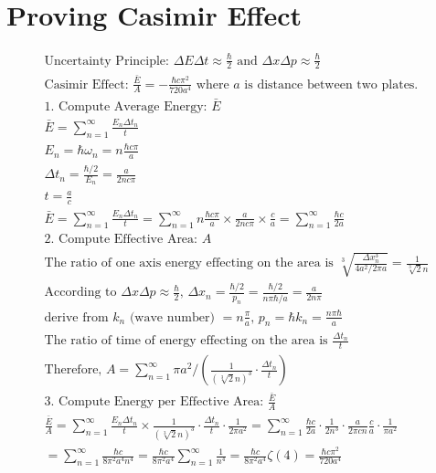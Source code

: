 \section{Proving Casimir Effect}
\begin{align*}
&\text{Uncertainty Principle: }\Delta E \Delta t \approx \frac{\hbar}{2} \text{ and } \Delta x \Delta p \approx \frac{\hbar}{2}& \\
&\text{Casimir Effect: } \frac{\bar{E}}{A} = - \frac{\hbar c \pi^2}{720 a^4} \text{ where } a \text{ is distance between two plates.}& \\
&\text{1. Compute Average Energy: }\bar{E}&\\
&\bar{E} = \sum_{n=1}^{\infty}\frac{E_n\Delta t_n}{t}& \\
&E_n = \hbar \omega_n = n \frac{ \hbar c \pi}{a}& \\
&\Delta t_n = \frac{\hbar/2}{E_n} = \frac{a}{2 n c \pi}&\\
&t = \frac{a}{c}&\\
&\bar{E} = \sum_{n=1}^{\infty} \frac{E_n \Delta t_n}{t} = \sum_{n=1}^{\infty} n \frac{ \hbar c \pi}{a} \times \frac{a}{2 n c \pi} \times \frac{c}{a} = \sum_{n=1}^{\infty} \frac{\hbar c }{2 a}&\\
&\text{2. Compute Effective Area: }A& \\
&\text{The ratio of one axis energy effecting on the area is }\sqrt[3]{\frac{\Delta x_n^3}{4 a^2/2 \pi a}} = \frac{1}{\sqrt[3]{2}n}&\\
&\text{According to }\Delta x \Delta p \approx \frac{\hbar}{2} \text{, }\Delta x_n = \frac{\hbar/2}{p_n} = \frac{\hbar/2}{n \pi \hbar/a} = \frac{a}{2 n \pi}&\\
&\text{derive from } k_n \text{ (wave number) } = n\frac{\pi}{a} \text{, }p_n = \hbar k_n = \frac{n \pi \hbar}{a}& \\
&\text{The ratio of time of energy effecting on the area is } \frac{\Delta t_n}{t}&\\
&\text{Therefore, } A = \sum_{n=1}^{\infty} \pi a^2 /(\frac{1}{(\sqrt[3]{2}n)^3} \cdot \frac{\Delta t_n}{t})&\\
&\text{3. Compute Energy per Effective Area: }\frac{\bar{E}}{A}&\\
&\frac{\bar{E}}{A} = \sum_{n=1}^{\infty}\frac{ E_n \Delta t_n}{t} \times \frac{1}{(\sqrt[3]{2}n)^3} \cdot \frac{\Delta t_n}{t} \cdot \frac{1}{2 \pi a^2}
= \sum_{n=1}^{\infty}\frac{\hbar c}{2 a}\cdot\frac{1}{2n^3}\cdot\frac{a}{2 \pi c n}\frac{c}{a} \cdot \frac{1}{\pi a^2} &\\
&= \sum_{n=1}^{\infty}\frac{\hbar c}{8 \pi^2 a^4 n^4}
= \frac{\hbar c}{8 \pi^2 a^4}\sum_{n=1}^{\infty}\frac{1}{n^4}
= \frac{\hbar c}{8 \pi^2 a^4} \zeta(4) = \frac{\hbar c \pi^2}{720 a^4}&\\
\\
\end{align*}